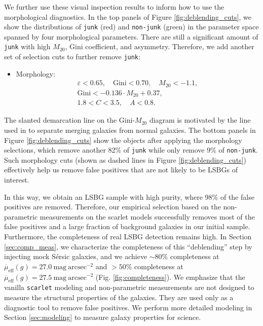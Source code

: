 \documentclass[twocolumn,astrosymb,twocolappendix]{aastex631}
\newcommand{\sbunit}{\mathrm{mag\ arcsec}^{-2}}
\newcommand{\sbeff}{\overline{\mu}_{\mathrm{eff}}(g)}
\newcommand{\code}[1]{\texttt{#1}}
\newcommand{\sersic}{S\'ersic}
\begin{document}
\begin{CJK*}{UTF8}{gbsn}
We further use these visual inspection results to inform how to use the morphological diagnostics. In the top panels of Figure \ref{fig:deblending_cuts}, we show the distributions of \code{junk} (red) and \code{non-junk} (green) in the parameter space spanned by four morphological parameters. There are still a significant amount of \code{junk} with high $M_{20}$, Gini coefficient, and asymmetry. Therefore, we add another set of selection cuts to further remove \code{junk}:
\begin{itemize}
    \item Morphology: 
    \begin{gather*}
        \varepsilon < 0.65,\quad \mathrm{Gini} < 0.70,\quad M_{20} < -1.1,\\
        \mathrm{Gini} < -0.136\cdot M_{20} + 0.37,\\
        1.8 < C < 3.5,\quad A < 0.8.
    \end{gather*}
\end{itemize}
The slanted demarcation line on the Gini-$M_{20}$ diagram is motivated by the line used in \citet{Lotz2008} to separate merging galaxies from normal galaxies. The bottom panels in Figure \ref{fig:deblending_cuts} show the objects after applying the morphology selections, which remove another 82\% of \code{junk} while only remove 9\% of \code{non-junk}. Such morphology cuts (shown as dashed lines in Figure \ref{fig:deblending_cuts}) effectively help us remove false positives that are not likely to be LSBGs of interest. 

In this way, we obtain an LSBG sample with high purity, where 98\% of the false positives are removed. Therefore, our empirical selection based on the non-parametric measurements on the scarlet models successfully removes most of the false positives and a large fraction of background galaxies in our initial sample. Furthermore, the completeness of real LSBG detection remains high. In Section \ref{sec:comp_meas}, we characterize the completeness of this ``deblending'' step by injecting mock \sersic{} galaxies, and we achieve $\sim80\%$ completeness at $\sbeff = 27.0\ \sbunit$ and $>50\%$ completeness at $\sbeff = 27.5\ \sbunit$ (Fig. \ref{fig:completeness}). We emphasize that the vanilla \code{scarlet} modeling and non-parametric measurements are not designed to measure the structural properties of the galaxies. They are used only as a diagnostic tool to remove false positives. We perform more detailed modeling in Section \ref{sec:modeling} to measure galaxy properties for science. 


\end{CJK*}
\end{document}

